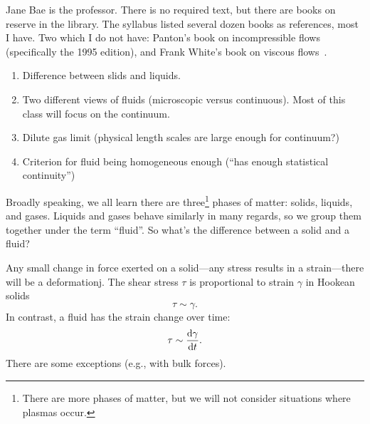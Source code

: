 
\lecture{}

\begin{node}
Jane Bae is the professor. There is no required text, but there are
books on reserve in the library. The syllabus listed several dozen
books as references, most I have. Two which I do not have: Panton's
book on incompressible flows~\cite{panton2024incompressible}
(specifically the 1995 edition), and Frank White's book on viscous flows~\cite{white1991viscous}.
\end{node}

\begin{node}[Overview]
\begin{enumerate}
\item Difference between slids and liquids.
\item Two different views of fluids (microscopic versus
  continuous). Most of this class will focus on the continuum.
\item Dilute gas limit (physical length scales are large enough for continuum?)
\item Criterion for fluid being homogeneous enough (``has enough
  statistical continuity'')
\end{enumerate}
\end{node}

\begin{node}
Broadly speaking, we all learn there are three\footnote{There are more
phases of matter, but we will not consider situations where plasmas
occur.} phases of matter: solids, liquids, and gases. Liquids and
gases behave similarly in many regards, so we group them together
under the term ``fluid''. So what's the difference between a solid and
a fluid?

Any small change in force exerted on a solid---any stress results in a
strain---there will be a deformationj. The shear stress $\tau$ is
proportional to strain $\gamma$ in Hookean solids
\begin{equation}
\tau\sim\gamma.
\end{equation}
In contrast, a fluid has the strain change over time:
\begin{equation}
\tau\sim\frac{\mathrm{d}\gamma}{\mathrm{d} t}.
\end{equation}
There are some exceptions (e.g., with bulk forces).
\end{node}

